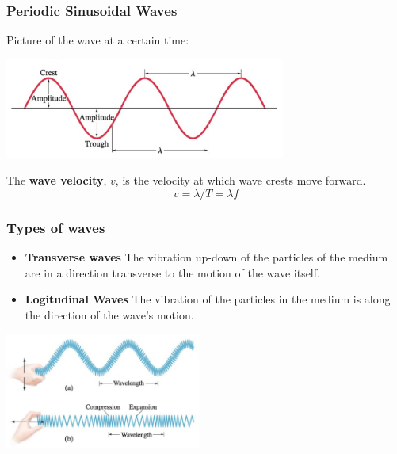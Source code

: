 \documentclass[]{beamer}
\begin{document}
\begin{frame}
\frametitle{Periodic Sinusoidal Waves}



Picture of the wave at a certain time:
\pause

\vspace{5mm}

  \begin{center}
  \includegraphics[height=1.3in]{images4/2.jpg}
\end{center}
\pause
The \textbf{wave velocity}, $v$, is the velocity at which wave crests move forward. 
\pause
\begin{equation}
\boxed{v=\lambda /T=\lambda f}
\end{equation}

  \end{frame}

\begin{frame}
\frametitle{Types of waves}
\pause
 \begin{itemize}
\item \textcolor{mypink1}{\textbf{Transverse waves}} The vibration up-down  of the particles of the medium are in a direction transverse to the motion of the wave itself.
\pause
\item \textcolor{mypink1}{\textbf{Logitudinal Waves}} The vibration of the particles in the medium is along the direction of the wave's motion.
\pause
\end{itemize}

\pause

 \begin{center}
  \includegraphics[height=1.5in]{images4/3.jpg}
\end{center}

\end{frame}
\end{document}
